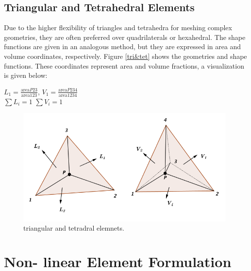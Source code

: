 \subsection{Triangular and Tetrahedral Elements}
Due to the higher flexibility of triangles and tetrahedra for meshing complex geometries, they are often preferred over quadrilaterals or hexahedral. The shape functions are given in an analogous method, but they are expressed in area and volume coordinates, respectively. Figure \ref{tri&tet} shows the geometries and shape functions. These coordinates represent area and volume fractions, a visualization is given below:
\begin{center}
	$L_1 = \frac{\text{area}P23}{\text{area}123}$, \quad $V_1 = \frac{\text{area}P234}{\text{area}1234}$ \\[4mm]
	$\sum L_i = 1$ \quad\quad $\sum V_i = 1$
\end{center}

\begin{figure}
	\begin{center}
		\includegraphics[width=11cm,clip]{Tri&Tet.pdf}			
		\caption{triangular and tetradral elemnets.} \label{fig: tri&tet}
	\end{center}
\end{figure}

\section{Non- linear Element Formulation}
